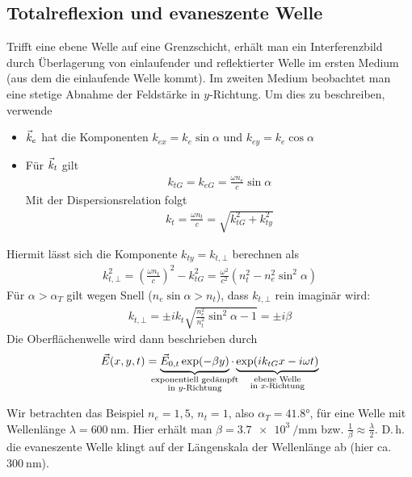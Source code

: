 \subsection{Totalreflexion und evaneszente Welle}
Trifft eine ebene Welle auf eine Grenzschicht,
erhält man ein Interferenzbild durch Überlagerung von einlaufender und
reflektierter Welle im ersten Medium (aus dem die einlaufende Welle kommt).
Im zweiten Medium beobachtet man eine stetige Abnahme der Feldstärke
in $y$-Richtung. Um dies zu beschreiben, verwende
\begin{itemize}
\item $\vec{k}_e$ hat die Komponenten 
  $k_{ex} = k_e\sin\alpha$ und $k_{ey} = k_e\cos\alpha$
\item Für $\vec{k}_t$ gilt
  \begin{gather*}
    k_{tG} = k_{eG} = \frac{\omega n_e}{c}\sin\alpha
  \end{gather*}
  Mit der Dispersionsrelation folgt
  \begin{gather*}
    k_t = \frac{\omega n_t}{c} 
    = \sqrt{k_{tG}^2 + k_{ty}^2}
  \end{gather*}
\end{itemize}
Hiermit lässt sich die Komponente $k_{ty}=k_{t,\bot}$ berechnen als
\begin{gather*}
  k_{t,\bot}^2 = \left(\frac{\omega n_t}{c}\right)^2 - k_{tG}^2
  = \frac{\omega^2}{c^2} \left( n_t^2 - n_e^2\sin^2\alpha \right)
\end{gather*}
Für $\alpha>\alpha_T$ gilt wegen Snell ($n_e\sin\alpha > n_t$),
dass $k_{t,\bot}$ rein imaginär wird:
\begin{gather*}
  k_{t,\bot} 
  = \pm ik_{t} \sqrt{\frac{n_e^2}{n_t^2}\sin^2\alpha - 1}
  = \pm i\beta
\end{gather*}
Die Oberflächenwelle wird dann beschrieben durch
\begin{gather*}
  \vecE(x,y,t) = 
  \underbrace{\vecE_{0,t}\exp(-\beta y)}_{\mathclap{\substack{
        \text{exponentiell gedämpft}\\\text{in $y$-Richtung}
      }}
  }
  \cdot 
  \underbrace{\exp(ik_{tG}x - i\omega t)}_{\mathclap{\substack{
        \text{ebene Welle}\\\text{in $x$-Richtung}
      }}
  }
\end{gather*}

Wir betrachten das Beispiel $n_e=1,5$, $n_t=1$, 
also $\alpha_T=\ang{41.8}$, für eine Welle mit Wellenlänge
$\lambda = \SI{600}{\nano\meter}$.
Hier erhält man $\beta = \SI{3.7e3}{\per\milli\meter}$
bzw. $\frac{1}{\beta}\approx\frac{\lambda}{2}$.
D.\,h. die evaneszente Welle klingt auf der Längenskala der Wellenlänge
ab (hier ca. $\SI{300}{\nano\meter}$).

